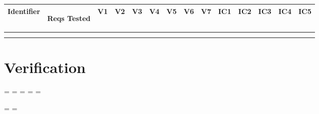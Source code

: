 \documentclass [10pt]{article}
\begin{document}
\begin{center}
\begin{tabularx} {\textwidth} {|c|c|c|c|c|c|c|c|c|c|c|c|c| c|}
\end{tabularx}


\begin{tabularx} {\textwidth} {|c|c|c|c|c|c|c|c|c|c|c|c|c| c|} \hline
  \hspace {1.9mm} \textbf{Identifier \hspace {1.9mm} } & \begin{minipage} {.075\columnwidth} \vspace{1mm} \begin {center}\textbf{Reqs Tested}\vspace{1mm}\end{center}\end{minipage}
 & \textbf{V1} &\textbf{V2} &\textbf{V3} &\textbf{V4} &\textbf{V5} &\textbf{V6}&\textbf{V7} &\textbf{IC1} &\textbf{IC2} &\textbf{IC3} &\textbf{IC4}&\textbf{IC5}  \\ \hline
 
  & & & & & & & & & & & & &\\ \hline
 & & & & & & & & & & & & &\\ \hline


\end{tabularx}

\end{center}





\section {Verification}











\newpage
\pagestyle{fancy}

\paperwidth=\pdfpageheight
\paperheight=\pdfpagewidth
\pdfpageheight=\paperheight
\pdfpagewidth=\paperwidth
\headwidth=\textheight



\begingroup

\vsize=\textwidth
\hsize=\textheight



\break

\end{document}
